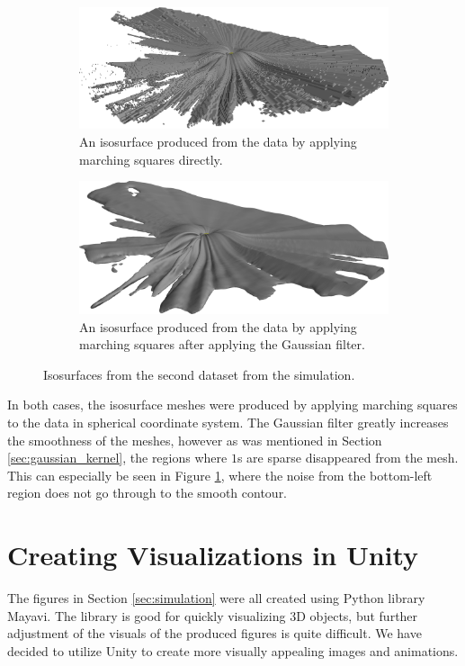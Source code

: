 \documentclass[a4paper,10pt]{report}
\begin{document}
\begin{figure}[H]
    \centering
    \begin{subfigure}{.49\textwidth}
        \includegraphics[width=\textwidth]{../images/3D/Dataset2.png}
    \caption{An isosurface produced from the data by applying marching squares directly.}
    \end{subfigure}
    \hfill
    \begin{subfigure}{.49\textwidth}
        \includegraphics[width=\textwidth]{../images/3D/Dataset2_Gaussian.png}
    \caption{An isosurface produced from the data by applying marching squares after applying the Gaussian filter.}
    \end{subfigure}
    \caption{Isosurfaces from the second dataset from the simulation.}
    \label{fig:Dataset2}
\end{figure}
In both cases, the isosurface meshes were produced by applying marching squares to the data in spherical coordinate system. The Gaussian filter greatly increases the smoothness of the meshes, however as was mentioned in Section \ref{sec:gaussian_kernel}, the regions where $1$s are sparse disappeared from the mesh. This can especially be seen in Figure \ref{fig:Dataset2}, where the noise from the bottom-left region does not go through to the smooth contour.

\chapter{Creating Visualizations in Unity}\label{chap:Unity}
The figures in Section \ref{sec:simulation} were all created using Python library Mayavi. The library is good for quickly visualizing 3D objects, but further adjustment of the visuals of the produced figures is quite difficult. We have decided to utilize Unity to create more visually appealing images and animations.
\end{document}
